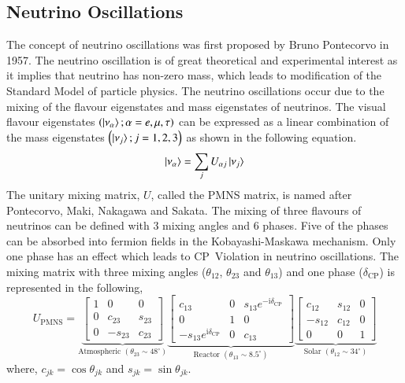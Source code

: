 \subsection{Neutrino Oscillations}
The concept of neutrino oscillations was first proposed by Bruno
Pontecorvo in 1957\cite{pontecorvo1,pontecorvo2}. The neutrino
oscillation is of great theoretical and experimental interest as it
implies that neutrino has non-zero mass, which leads to modification
of the Standard Model of particle physics. The neutrino oscillations occur due to the mixing of the flavour eigenstates and mass eigenstates of
neutrinos. The visual flavour eigenstates
$\left(\ket{\nu_{\alpha}};\alpha=e,\mu,\tau\right)$ can be expressed as
a linear combination of the mass eigenstates
$\left(\ket{\nu_{j}};j=1,2,3\right)$ as shown in the following equation.
\begin{equation}
  \ket{\nu_{\alpha}}=\sum_{j}U_{\alpha j}\ket{\nu_{j}} \label{eq:tzero}
\end{equation}
The unitary mixing matrix, $U$, called the PMNS matrix, is named after
Pontecorvo, Maki, Nakagawa and Sakata. The mixing of three flavours of
neutrinos can be defined with 3 mixing angles and 6 phases. Five of
the phases can be absorbed into fermion fields in the Kobayashi-Maskawa
mechanism\cite{kobayashimaskawa}. Only one phase has an effect which
leads to CP~Violation in neutrino oscillations. The mixing matrix with
three mixing angles ($\theta_{12}$, $\theta_{23}$ and $\theta_{13}$) and
one phase ($\delta_{\mathrm{CP}}$) is represented in the following,
\begin{equation}
  U_{\mathrm{PMNS}} =
  \underbrace{\begin{bmatrix}
      1 & 0 & 0 \\
      0 & c_{23} & s_{23} \\
      0 & -s_{23} & c_{23}
    \end{bmatrix}
  }_{\text{Atmospheric }\left(\theta_{23}\sim 48^{\circ}\right)}
  \underbrace{\begin{bmatrix}
      c_{13} & 0 & s_{13}e^{-\mathrm{i}\delta_{\mathrm{CP}}} \\
      0 & 1 & 0 \\
      -s_{13}e^{\mathrm{i}\delta_{\mathrm{CP}}} & 0 & c_{13}
    \end{bmatrix}
  }_{\text{Reactor }\left(\theta_{13}\sim 8.5^{\circ}\right)}
  \underbrace{\begin{bmatrix}
      c_{12} & s_{12} & 0 \\
      -s_{12} & c_{12} & 0 \\
      0 & 0 & 1
    \end{bmatrix}
  }_{\text{Solar }\left(\theta_{12}\sim 34^{\circ}\right)}
   \label{eq:pmns}
\end{equation}
where, $c_{jk}=\cos\theta_{jk}$ and $s_{jk}=\sin\theta_{jk}$.

